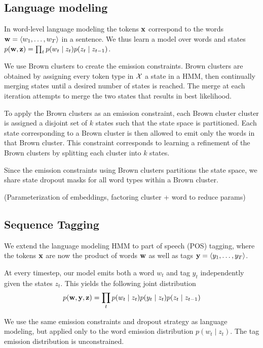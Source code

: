 \documentclass[11pt,a4paper]{article}
\begin{document}
\subsection{Language modeling}
In word-level language modeling the tokens $\mathbf{x}$ correspond to the words
$\mathbf{w} = \langle w_1,\ldots,w_T \rangle$ in a sentence.
We thus learn a model over words and states
$p(\mathbf{w},\mathbf{z}) = \prod_t p(w_t\mid z_t)p(z_t \mid z_{t-1})$.

We use Brown clusters \citep{brown1992} to create the emission constraints.
Brown clusters are obtained by assigning every token type in $\mathcal{X}$ a state in a HMM,
then continually merging states until a desired number of states is reached.
The merge at each iteration attempts to merge the two states that results in best likelihood.

To apply the Brown clusters as an emission constraint,
each Brown cluster cluster is assigned a disjoint set of $k$ states
such that the state space is partitioned.
Each state corresponding to a Brown cluster is then allowed to emit only
the words in that Brown cluster.
This constraint corresponds to learning a refinement of the Brown clusters
by splitting each cluster into $k$ states.

Since the emission constraints using Brown clusters partitions the state space,
we share state dropout masks for all word types within a Brown cluster.

(Parameterization of embeddings, factoring cluster + word to reduce params)

\subsection{Sequence Tagging}
We extend the language modeling HMM to part of speech (POS) tagging,
where the tokens $\mathbf{x}$ are now the product of words $\mathbf{w}$ as well as tags
$\mathbf{y} = \langle y_1, \ldots, y_T \rangle$.

At every timestep, our model emits both a word $w_t$ and tag $y_t$
independently given the states $z_t$.
This yields the following joint distribution
\begin{equation}
\begin{aligned}
p(\mathbf{w}, \mathbf{y}, \mathbf{z})
&= \prod_t p(w_t \mid z_t)p(y_t \mid z_t)p(z_t\mid z_{t-1})\\
\end{aligned}
\end{equation}

We use the same emission constraints and dropout strategy as language modeling,
but applied only to the word emission distribution $p(w_t \mid z_t)$.
The tag emission distribution is unconstrained.
\end{document}

